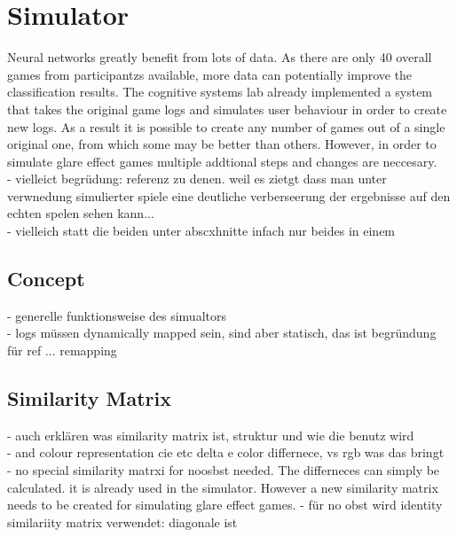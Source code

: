 \chapter{Simulator}

Neural networks greatly benefit from lots of data. As there are only 40  overall games from participantzs available, more data can potentially improve the classification results.  The cognitive systems lab already implemented a system that takes the original game logs and simulates user behaviour in order to create new logs. As a result it is possible to create any number of games out of a single original one, from which some may be better than others. However, in order to simulate glare effect games multiple addtional steps and changes are neccesary. \\


- vielleict begrüdung: referenz zu denen. weil es zietgt dass man unter verwnedung simulierter spiele eine deutliche verberseerung der ergebnisse auf den echten spelen sehen kann...\\
- vielleich statt die beiden unter abscxhnitte infach nur beides in einem 
\section{Concept}
- generelle funktionsweise des simualtors\\
- logs müssen dynamically mapped sein, sind aber statisch, das ist begründung für ref ... remapping
\section{Similarity Matrix}
- auch erklären was similarity matrix ist, struktur und wie die benutz wird\\
- and colour representation cie etc delta e color differnece, vs rgb was das bringt\\ 
- no special similarity matrxi for noosbst needed. The differneces can simply be calculated. it is already used in the simulator. However a new similarity matrix needs to be created for simulating glare effect games. 
- für no obst wird identity similariity matrix verwendet: diagonale ist 